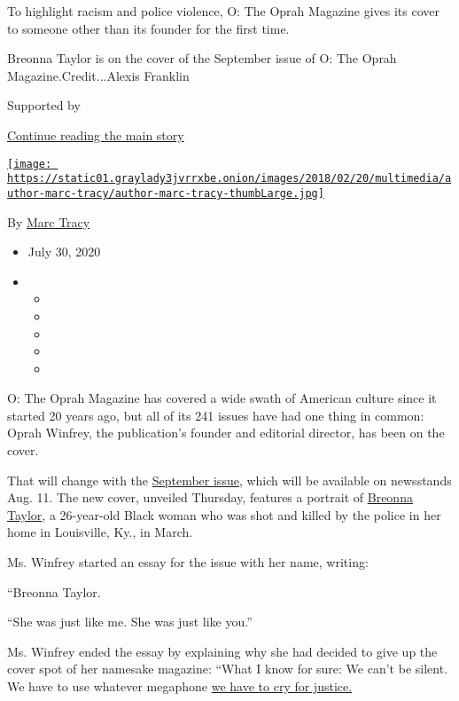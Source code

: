 To highlight racism and police violence, O: The Oprah Magazine gives its
cover to someone other than its founder for the first time.

Breonna Taylor is on the cover of the September issue of O: The Oprah
Magazine.Credit...Alexis Franklin

Supported by

\protect\hyperlink{after-sponsor}{Continue reading the main story}

\href{https://www.nytimes3xbfgragh.onion/by/marc-tracy}{\texttt{[image: https://static01.graylady3jvrrxbe.onion/images/2018/02/20/multimedia/author-marc-tracy/author-marc-tracy-thumbLarge.jpg]}}

By \href{https://www.nytimes3xbfgragh.onion/by/marc-tracy}{Marc Tracy}

\begin{itemize}
\item
  July 30, 2020
\item
  \begin{itemize}
  \item
  \item
  \item
  \item
  \item
  \end{itemize}
\end{itemize}

O: The Oprah Magazine has covered a wide swath of American culture since
it started 20 years ago, but all of its 241 issues have had one thing in
common: Oprah Winfrey, the publication's founder and editorial director,
has been on the cover.

That will change with the
\href{https://www.oprahmag.com/life/a33449982/oprah-breonna-taylor/}{September
issue}, which will be available on newsstands Aug. 11. The new cover,
unveiled Thursday, features a portrait of
\href{https://www.nytimes3xbfgragh.onion/article/breonna-taylor-police.html}{Breonna
Taylor}, a 26-year-old Black woman who was shot and killed by the police
in her home in Louisville, Ky., in March.

Ms. Winfrey started an essay for the issue with her name, writing:

``Breonna Taylor.

``She was just like me. She was just like you.''

Ms. Winfrey ended the essay by explaining why she had decided to give up
the cover spot of her namesake magazine: ``What I know for sure: We
can't be silent. We have to use whatever megaphone
\href{https://www.oprahmag.com/life/a32838616/white-privilege-lesson-black-lives-matter-movement/}{we
have to cry for justice.}

